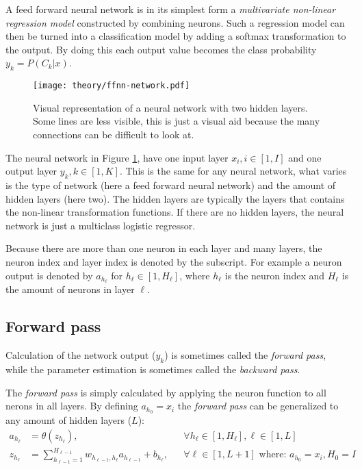 A feed forward neural network is in its simplest form a \textit{multivariate non-linear regression model} constructed by combining neurons. Such a regression model can then be turned into a classification model by adding a softmax transformation \cite{the-elements-of-statistical-learning} to the output. By doing this each output value becomes the class probability $y_k = P(C_k | x)$.

\begin{figure}[h]
	\centering
	\texttt{[image: theory/ffnn-network.pdf]}
	\caption{Visual representation of a neural network with two hidden layers. Some lines are less visible, this is just a visual aid because the many connections can be difficult to look at.}
	\label{fig:theory:ffnn:network}
\end{figure}

The neural network in Figure \ref{fig:theory:ffnn:network}, have one input layer $x_i, i \in [1, I]$ and one output layer $y_k, k \in [1, K]$. This is the same for any neural network, what varies is the type of network (here a feed forward neural network) and the amount of hidden layers (here two). The hidden layers are typically the layers that contains the non-linear transformation functions. If there are no hidden layers, the neural network is just a multiclass logistic regressor\cite{bishop}.

Because there are more than one neuron in each layer and many layers, the neuron index and layer index is denoted by the subscript. For example a neuron output is denoted by $a_{h_{\ell}}$ for $h_{\ell} \in [1, H_{\ell}]$, where $h_{\ell}$ is the neuron index and $H_\ell$ is the amount of neurons in layer $\ell$.

\subsection{Forward pass}

Calculation of the network output ($y_k$) is sometimes called the \textit{forward pass}, while the parameter estimation is sometimes called the \textit{backward pass}.

The \textit{forward pass} is simply calculated by applying the neuron function to all nerons in all layers. By defining $a_{h_0} = x_i$ the \textit{forward pass} can be generalized to any amount of hidden layers ($L$):
\begin{equation}
\begin{aligned}
a_{h_\ell} &= \theta(z_{h_\ell}), && \forall h_{\ell} \in [1, H_{\ell}], \ell \in [1, L] \\
z_{h_\ell} &= \sum_{h_{\ell-1} = 1}^{H_{\ell-1}} w_{h_{\ell-1}, h_{\ell}} a_{h_{\ell-1}} + b_{h_{\ell}}, && \forall \ell \in [1, L+1] \text{ where: } a_{h_0} = x_i, H_0 = I \\
\end{aligned}
\end{equation}

